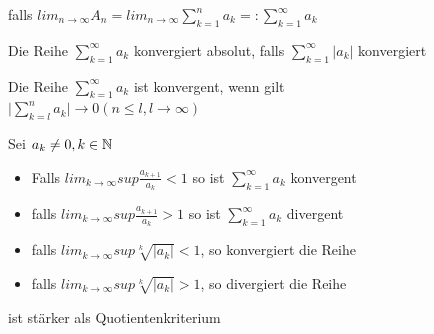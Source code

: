 \documentclass[a4paper]{article}
\begin{document}
\begin{multicols}{2}
	\begin{fdef}
		falls $lim_{n \to \infty} A_n = lim_{n\to \infty} \sum_{k=1}^n a_k=: \sum_{k=1}^{\infty} a_k$
	\end{fdef}

	\begin{fdef}
		Die Reihe $\sum_{k=1}^{\infty} a_k$ konvergiert absolut, falls $\sum_{k=1}^{\infty} \vert a_k
		\vert$ konvergiert
	\end{fdef}
\end{multicols}
	\begin{fsatz}[Cauchy]
		Die Reihe $\sum_{k=1}^{\infty} a_k$ ist konvergent, wenn
		gilt\\
		$\vert \sum_{k=l}^n a_k \vert \rightarrow 0 (n\leq l, l\rightarrow \infty)$
	\end{fsatz}

	\begin{multicols}{2}
		\begin{fsatz}[Quotientenkriterium]
			Sei $a_k \ne 0, k\in \mathbb{N}$
			\vspace{-3mm}
			\begin{itemize}
				\item Falls $lim_{k\to \infty} sup
				\frac{a_{k+1}}{a_k}<1$ \quad so ist $\sum_{k=1}^{\infty}a_k$
				konvergent
				\vspace{-5mm}
				\item falls $lim_{k\to\infty} sup\frac{a_{k+1}}{a_k}>1$
				\quad so ist $\sum_{k=1}^{\infty}a_k$ divergent
				\vspace{-4mm}
			\end{itemize}
		\end{fsatz}
	
		\begin{fsatz}[Wurzelkriterium]
		\vspace{-1mm}
			\begin{itemize}
				\item falls $lim_{k\to\infty} sup \sqrt[k]{\vert a_k\vert} <
				1$, so konvergiert die Reihe
				\vspace{-2mm}
				\item falls $lim_{k\to\infty} sup \sqrt[k]{\vert a_k\vert}
				> 1$, so divergiert die Reihe
				\vspace{-2mm}
			\end{itemize}
			ist stärker als Quotientenkriterium
		\end{fsatz}
	\end{multicols}
	
\end{document}
